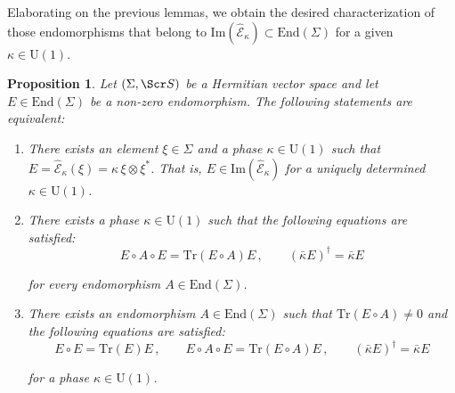 \documentclass[10pt,a4paper,twoside,reqno]{amsart}
\theoremstyle{plain}
\newtheorem{prop}[thm]{Proposition}
\theoremstyle{definition}
\theoremstyle{remark}
\newcommand{\End}{\mathrm{End}}
\newcommand{\Tr}{\mathrm{Tr}}
\def\scS{\Scr S}
\def\U{\mathrm{U}}
\def\hcE{\widehat{\mathcal{E}}}
\def\Im{\mathrm{Im}}
\begin{document}
\noindent
Elaborating on the previous lemmas, we obtain the desired characterization of those endomorphisms that belong to $\Im(\hcE_\kappa)\subset\End(\Sigma)$ for a given $\kappa \in \U(1)$.
\begin{prop}
\label{prop:algebraichHermitian}
Let $(\Sigma,\scS)$ be a Hermitian vector space and let $E\in \End(\Sigma)$ be a non-zero endomorphism. The following statements are equivalent:   

\begin{enumerate}
\item[\normalfont(a)] There exists an element $\xi\in \Sigma$ and a phase $\kappa \in \U(1)$ such that $E = \hcE_{\kappa}(\xi) = \kappa\, \xi \otimes \xi^{\ast}$. That is, $E\in \Im (\hcE_{\kappa})$ for a uniquely determined $\kappa \in \U(1)$.
\item[\normalfont(b)]  There exists a phase $\kappa\in \U(1)$ such that the following equations are satisfied:
\begin{equation*}
E \circ A \circ E=\Tr(E\circ A)E\, , \qquad (\bar\kappa E)^\dagger = \bar\kappa E
\end{equation*}

\noindent
for every endomorphism $A\in \End(\Sigma)$.

\item[\normalfont(c)]  There exists an endomorphism $A\in\End(\Sigma)$ such that $\Tr(E\circ A)\neq 0$ and the following equations are satisfied:
\begin{equation*}
E\circ E=\Tr(E)E\, , \qquad E \circ A \circ E=\Tr(E\circ A)E\, , \qquad (\bar\kappa E)^\dagger = \bar\kappa E
\end{equation*}

\noindent
for a phase $\kappa\in \U(1)$.
\end{enumerate}
\end{prop}
\end{document}
